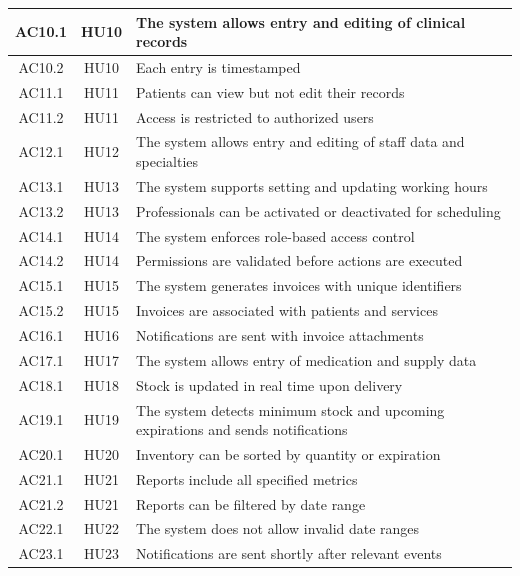 \begin{longtable}{|c|c|p{9cm}|}
AC10.1 & HU10 & The system allows entry and editing of clinical records \\
\hline
AC10.2 & HU10 & Each entry is timestamped \\
\hline

AC11.1 & HU11 & Patients can view but not edit their records \\
\hline
AC11.2 & HU11 & Access is restricted to authorized users \\
\hline

AC12.1 & HU12 & The system allows entry and editing of staff data and specialties \\
\hline

AC13.1 & HU13 & The system supports setting and updating working hours \\
\hline
AC13.2 & HU13 & Professionals can be activated or deactivated for scheduling \\
\hline

AC14.1 & HU14 & The system enforces role-based access control \\
\hline
AC14.2 & HU14 & Permissions are validated before actions are executed \\
\hline

AC15.1 & HU15 & The system generates invoices with unique identifiers \\
\hline
AC15.2 & HU15 & Invoices are associated with patients and services \\
\hline

AC16.1 & HU16 & Notifications are sent with invoice attachments \\
\hline

AC17.1 & HU17 & The system allows entry of medication and supply data \\
\hline

AC18.1 & HU18 & Stock is updated in real time upon delivery \\
\hline

AC19.1 & HU19 & The system detects minimum stock and upcoming expirations and sends notifications \\
\hline

AC20.1 & HU20 & Inventory can be sorted by quantity or expiration \\
\hline

AC21.1 & HU21 & Reports include all specified metrics \\
\hline
AC21.2 & HU21 & Reports can be filtered by date range \\
\hline

AC22.1 & HU22 & The system does not allow invalid date ranges \\
\hline

AC23.1 & HU23 & Notifications are sent shortly after relevant events \\

\end{longtable}


